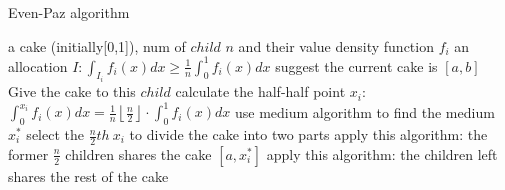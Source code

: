 \documentclass{article}
\begin{document}
	\begin{algorithm}[!h]
		\caption{Even-Paz algorithm}
		\label{whatever}  
		\begin{algorithmic}
			\Require  
			a cake (initially[0,1]), num of $child$ $n$ and their value density function $f_i$
			\Ensure  
			an allocation $I: \int_{I_i} f_i(x) d x \geq \frac{1}{n} \int_0^1 f_i(x) d x$
			\State suggest the current cake is $[a,b]$
			\State Give the cake to this $child$ 
			\EndIf
			\State calculate the half-half point $x_i$:
			\State $\int_0^{x_i} f_i(x) d x=\frac{1}{n}\left\lfloor\frac{n}{2}\right\rfloor \cdot \int_0^1 f_i(x) d x$
			\State use medium algorithm to find the medium $x_i^*$
			\EndFor
			\State select the $\frac{n}{2}th~x_i$ to divide the cake into two parts
			\State apply this algorithm: the former $\frac{n}{2}$ children shares the cake $[a,x_i^*]$
			\State apply this algorithm: the children left shares the rest of the cake
		\end{algorithmic}  
	\end{algorithm}
\end{document}
